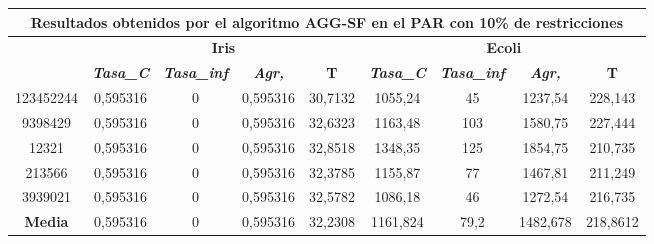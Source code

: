 \documentclass[12pt, spanish]{article}
\begin{document}
\begin{table}[H]
\footnotesize
\begin{tabular}{|c|c|c|c|c|c|c|c|c|}
\hline
\multicolumn{9}{|c|}{\textbf{Resultados obtenidos por el algoritmo AGG-SF en el PAR con 10\% de restricciones}}                                                                                                   \\ \hline
\multirow{2}{*}{} & \multicolumn{4}{c|}{\textbf{Iris}}                                                            & \multicolumn{4}{c|}{\textbf{Ecoli}}                                                           \\ \cline{2-9} 
                  & \textit{\textbf{Tasa\_C}} & \textit{\textbf{Tasa\_inf}} & \textit{\textbf{Agr,}} & \textbf{T} & \textit{\textbf{Tasa\_C}} & \textit{\textbf{Tasa\_inf}} & \textit{\textbf{Agr,}} & \textbf{T} \\ \hline
123452244         & 0,595316                  & 0                           & 0,595316               & 30,7132    & 1055,24                   & 45                          & 1237,54                & 228,143    \\ \hline
9398429           & 0,595316                  & 0                           & 0,595316               & 32,6323    & 1163,48                   & 103                         & 1580,75                & 227,444    \\ \hline
12321             & 0,595316                  & 0                           & 0,595316               & 32,8518    & 1348,35                   & 125                         & 1854,75                & 210,735    \\ \hline
213566            & 0,595316                  & 0                           & 0,595316               & 32,3785    & 1155,87                   & 77                          & 1467,81                & 211,249    \\ \hline
3939021           & 0,595316                  & 0                           & 0,595316               & 32,5782    & 1086,18                   & 46                          & 1272,54                & 216,735    \\ \hline
\textbf{Media}    & 0,595316                  & 0                           & 0,595316               & 32,2308    & 1161,824                  & 79,2                        & 1482,678               & 218,8612   \\ \hline
\end{tabular}
\end{table}
\end{document}
